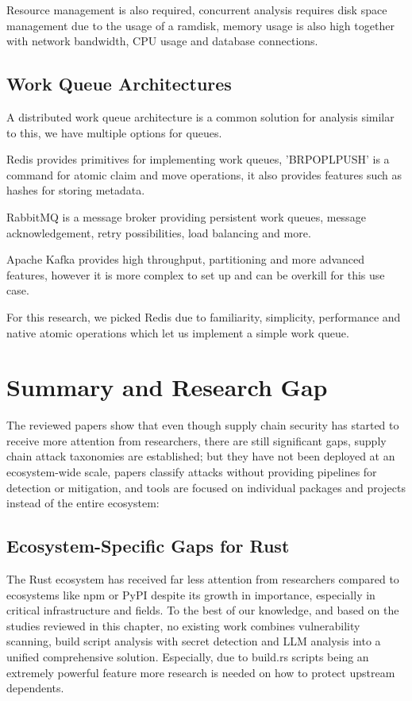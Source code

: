 Resource management is also required, concurrent analysis requires disk space management due to the usage of a ramdisk, memory usage is also high together with network bandwidth, CPU usage and database connections.

\subsection{Work Queue Architectures}\label{sect:work-queue-architectures}

A distributed work queue architecture is a common solution for analysis similar to this, we have multiple options for queues.

Redis provides primitives for implementing work queues, 'BRPOPLPUSH' is a command for atomic claim and move operations, it also provides features such as hashes for storing metadata.

RabbitMQ is a message broker providing persistent work queues, message acknowledgement, retry possibilities, load balancing and more.

Apache Kafka provides high throughput, partitioning and more advanced features, however it is more complex to set up and can be overkill for this use case.

For this research, we picked Redis due to familiarity, simplicity, performance and native atomic operations which let us implement a simple work queue.

\section{Summary and Research Gap}\label{sect:research-gap}

The reviewed papers show that even though supply chain security has started to receive more attention from researchers, there are still significant gaps, supply chain attack taxonomies are established\cite{ohm2020backstabber,ladisa2023taxonomy}; but they have not been deployed at an ecosystem-wide scale, papers classify attacks without providing pipelines for detection or mitigation, and tools are focused on individual packages and projects instead of the entire ecosystem:

\subsection{Ecosystem-Specific Gaps for Rust}\label{sect:ecosystem-specific-gaps-rust}

The Rust ecosystem has received far less attention from researchers compared to ecosystems like npm or PyPI despite its growth in importance, especially in critical infrastructure and fields.
To the best of our knowledge, and based on the studies reviewed in this chapter, no existing work combines vulnerability scanning, build script analysis with secret detection and LLM analysis into a unified comprehensive solution.
Especially, due to build.rs scripts being an extremely powerful feature more research is needed on how to protect upstream dependents.

